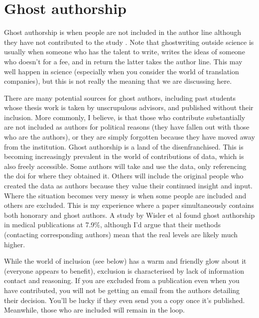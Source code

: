 \documentclass[
]{krantz}
\begin{document}
\hypertarget{ghost-authorship}{%
\section{Ghost authorship}\label{ghost-authorship}}

Ghost authorship is when people are not included in the author line although they have not contributed to the study \citep{matheson2016ghostwriting}. Note that ghostwriting outside science is usually when someone who has the talent to write, writes the ideas of someone who doesn't for a fee, and in return the latter takes the author line. This may well happen in science (especially when you consider the world of translation companies), but this is not really the meaning that we are discussing here.

There are many potential sources for ghost authors, including past students whose thesis work is taken by unscrupulous advisors, and published without their inclusion. More commonly, I believe, is that those who contribute substantially are not included as authors for political reasons (they have fallen out with those who are the authors), or they are simply forgotten because they have moved away from the institution. Ghost authorship is a land of the disenfranchised. This is becoming increasingly prevalent in the world of contributions of data, which is also freely accessible. Some authors will take and use the data, only referencing the doi for where they obtained it. Others will include the original people who created the data as authors because they value their continued insight and input. Where the situation becomes very messy is when some people are included and others are excluded. This is my experience where a paper simultaneously contains both honorary and ghost authors. A study by Wisler et al \citeyearpar{wislar2011honorary} found ghost authorship in medical publications at 7.9\%, although I'd argue that their methods (contacting corresponding authors) mean that the real levels are likely much higher.

While the world of inclusion (see below) has a warm and friendly glow about it (everyone appears to benefit), exclusion is characterised by lack of information contact and reasoning. If you are excluded from a publication even when you have contributed, you will not be getting an email from the authors detailing their decision. You'll be lucky if they even send you a copy once it's published. Meanwhile, those who are included will remain in the loop.
\end{document}
